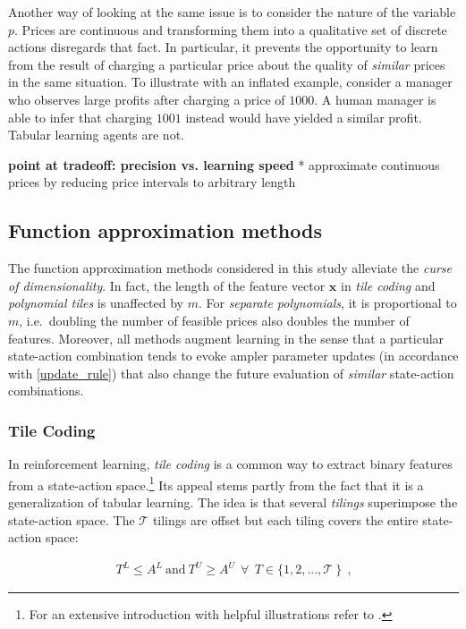 Another way of looking at the same issue is to consider the nature of the variable $p$. Prices are continuous and transforming them into a qualitative set of discrete actions disregards that fact. In particular, it prevents the opportunity to learn from the result of charging a particular price about the quality of \emph{similar} prices in the same situation. To illustrate with an inflated example, consider a manager who observes large profits after charging a price of $1000$. A human manager is able to infer that charging $1001$ instead would have yielded a similar profit. Tabular learning agents are not.


\textbf{point at tradeoff: precision vs. learning speed}
			* approximate continuous prices by reducing price intervals to arbitrary length



\subsection{Function approximation methods}

The function approximation methods considered in this study alleviate the \emph{curse of dimensionality}. In fact, the length of the feature vector $\boldsymbol{x}$ in \emph{tile coding} and \emph{polynomial tiles} is unaffected by $m$. For \emph{separate polynomials}, it is proportional to $m$, i.e.\ doubling the number of feasible prices also doubles the number of features. Moreover, all methods augment learning in the sense that a particular state-action combination tends to evoke ampler parameter updates (in accordance with \autoref{update_rule}) that also change the future evaluation of \emph{similar} state-action combinations.

\subsubsection{Tile Coding}\label{tile_coding}
In reinforcement learning, \emph{tile coding} is a common way to extract binary features from a state-action space.\footnote{For an extensive introduction with helpful illustrations refer to \textcite{sutton_reinforcement_2018}.} Its appeal stems partly from the fact that it is a generalization of tabular learning. The idea is that several \emph{tilings} superimpose the state-action space. The $\mathcal{T}$ tilings are offset but each tiling covers the entire state-action space:

\begin{gather}
	 T^L \leq A^L  ~ \text{and} ~ T^U \geq A^U ~~ \forall  ~~ T \in \{1, 2, ..., \mathcal{T} ~ \} ~~ \text{,}
\end{gather}

